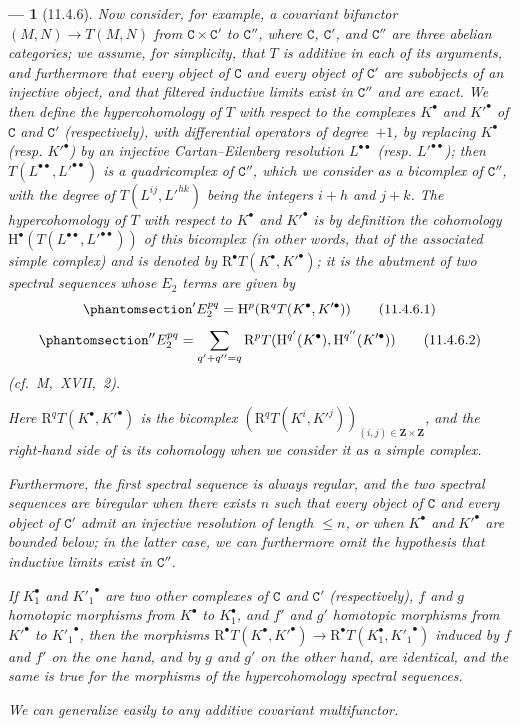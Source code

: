\documentclass[oneside]{amsart}
\theoremstyle{ega-env-style}
\newtheorem*{env}{---}
\theoremstyle{ega-thm-env-style}
\theoremstyle{ega-defn-env-style}
\def\bb{\mathbf}                    %
\def\cat{\mathtt}                   %
\def\leq{\leqslant}                 %
\def\HH{\mathrm{H}}                 %
\def\RR{\mathrm{R}}                 %
\newcommand{\oldpage}[2][]{{\marginnote{\normalfont{\textbf{#1}~|~#2}}}\ignorespaces}
\let\EGAOriginalLabel\label
\renewcommand{\label}[1]{\phantomsection\EGAOriginalLabel{#1}}
\begin{document}
\begin{env}[11.4.6]
\label{0.11.4.6}
Now consider, for example, a covariant bifunctor $(M, N) \rightarrow T(M, N)$ from $\cat{C} \times \cat{C}'$ to $\cat{C}''$, where $\cat{C}$, $\cat{C}'$, and $\cat{C}''$ are three abelian categories;
we assume, for simplicity, that $T$ is additive in each of its arguments, and furthermore that every object of $\cat{C}$ and every object of $\cat{C}'$ are subobjects of an injective object, 
and that filtered inductive limits exist in $\cat{C}''$ and are exact.
We then define the \emph{hypercohomology} of $T$ with respect to the complexes $K^\bullet$ and $K'^\bullet$ of $\cat{C}$ and $\cat{C}'$ (respectively), with differential operators of degree~$+1$, by replacing $K^\bullet$ (resp. $K'^\bullet$) by an injective Cartan--Eilenberg resolution $L^{\bullet\bullet}$ (resp. $L'^{\bullet\bullet}$);
then $T(L^{\bullet\bullet}, L'^{\bullet\bullet})$ is a quadricomplex of $\cat{C}''$, which we consider as a \emph{bicomplex} of $\cat{C}''$, with the degree of $T(L^{ij}, L'^{hk})$ being the integers $i+h$ and $j+k$.
The \emph{hypercohomology} of $T$ with respect to $K^\bullet$ and $K'^\bullet$ is by definition the cohomology $\HH^\bullet(T(L^{\bullet\bullet}, L'^{\bullet\bullet}))$ of this bicomplex  (in other words, that of the associated simple complex) and is denoted by $\RR^\bullet T(K^\bullet, K'^\bullet)$;
\oldpage[0\textsubscript{III}]{35}
it is the abutment of two spectral sequences whose $E_2$ terms are given by
\[
\label{0.11.4.6.1}
  'E_2^{pq}
  = \HH^p(\RR^q T(K^\bullet, K'^\bullet))
\tag{11.4.6.1}
\]
\[
\label{0.11.4.6.2}
  ''E_2^{pq}
  = \sum_{q'+q''=q}\RR^p T(\HH^{q'}(K^\bullet),\HH^{q''}(K'^\bullet))
\tag{11.4.6.2}
\]
(cf.~M,~XVII,~2).

Here $\RR^q T(K^\bullet, K'^\bullet)$ is the bicomplex $(\RR^q T(K^i, K'^j))_{(i,j)\in \bb{Z}\times \bb{Z}}$, and the right-hand side of  is its cohomology when we consider it as a simple complex.

Furthermore, the first spectral sequence is always regular, and the two spectral sequences are biregular when there exists $n$ such that every object of $\cat{C}$ and every object of $\cat{C}'$ admit an injective resolution of length $\leq n$, or when $K^\bullet$ and $K'^\bullet$ are bounded below;
in the latter case, we can furthermore omit the hypothesis that inductive limits exist in $\cat{C}''$.

If $K_1^\bullet$ and ${K'_1}^\bullet$ are two other complexes of $\cat{C}$ and $\cat{C}'$ (respectively), $f$ and $g$ \emph{homotopic} morphisms from $K^\bullet$ to $K_1^\bullet$, 
and $f'$ and $g'$ \emph{homotopic} morphisms from $K'^\bullet$ to ${K'_1}^\bullet$, then the morphisms $\RR^\bullet  T(K^\bullet, K'^\bullet) \rightarrow \RR^\bullet  T(K_1^\bullet, {K'_1}^\bullet)$ induced by $f$ and $f'$ on the one hand, and by $g$ and $g'$ on the other hand, are identical, and the same is true for the morphisms of the hypercohomology spectral sequences.

We can generalize easily to any additive covariant multifunctor.
\end{env}
\end{document}
